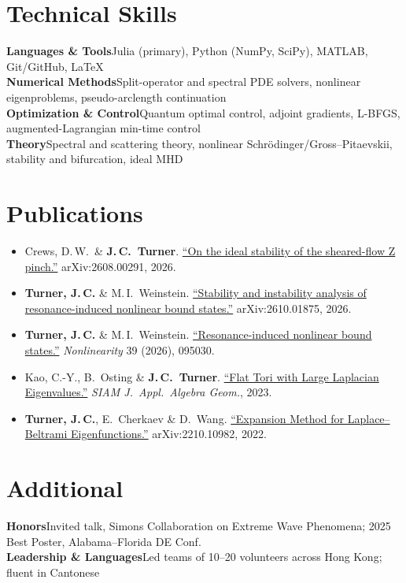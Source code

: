 \documentclass[10pt]{article}
\begin{document}
\section*{Technical Skills}

\textbf{Languages \& Tools}\quad Julia (primary), Python (NumPy, SciPy), MATLAB, Git/GitHub, LaTeX\\[3pt]
\textbf{Numerical Methods}\quad Split-operator and spectral PDE solvers, nonlinear eigenproblems, pseudo-arclength continuation\\[3pt]
\textbf{Optimization \& Control}\quad Quantum optimal control, adjoint gradients, L-BFGS, augmented-Lagrangian min-time control\\[3pt]
\textbf{Theory}\quad Spectral and scattering theory, nonlinear Schr\"odinger/Gross--Pitaevskii, stability and bifurcation, ideal MHD
\vspace{2pt}
\section*{Publications}
{\small
\begin{itemize}[itemsep=3pt]
    \item Crews, D.\,W.\ \& \textbf{J.\,C.\ Turner}.
    \href{https://arxiv.org/abs/2608.00291}
    {``On the ideal stability of the sheared-flow Z pinch.''}
    arXiv:2608.00291, 2026.

    \item \textbf{Turner, J.\,C.} \& M.\,I.\ Weinstein.
    \href{https://arxiv.org/abs/2610.01875}
    {``Stability and instability analysis of resonance-induced nonlinear bound states.''}
    arXiv:2610.01875, 2026.

    \item \textbf{Turner, J.\,C.} \& M.\,I.\ Weinstein.
    \href{https://iopscience.iop.org/article/10.1088/1361-6544/ae9de1}
    {``Resonance-induced nonlinear bound states.''}
    \textit{Nonlinearity} 39 (2026), 095030.

    \item Kao, C.-Y., B.\ Osting \& \textbf{J.\,C.\ Turner}. 
    \href{https://epubs.siam.org/doi/10.1137/22M1478823}
    {``Flat Tori with Large Laplacian Eigenvalues.''} 
    \textit{SIAM J.\ Appl.\ Algebra Geom.}, 2023.

    \item \textbf{Turner, J.\,C.}, E.\ Cherkaev \& D.\ Wang. 
    \href{https://arxiv.org/abs/2210.10982}
    {``Expansion Method for Laplace--Beltrami Eigenfunctions.''} 
    arXiv:2210.10982, 2022.
\end{itemize}
}

\section*{Additional}
\textbf{Honors}\quad Invited talk, Simons Collaboration on Extreme Wave Phenomena; 2025 Best Poster, Alabama--Florida DE Conf.\\[3pt]
\textbf{Leadership \& Languages}\quad Led teams of 10--20 volunteers across Hong Kong; fluent in Cantonese
\end{document}
